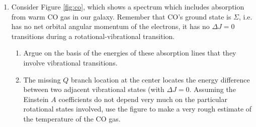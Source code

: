 \documentclass[11pt, preprint]{article}
\begin{document}
\begin{enumerate}
\item Consider Figure \ref{fig:co}, which shows a spectrum which
  includes absorption from warm CO gas in our galaxy.
    Remember that CO's ground state is $\Sigma$, i.e. has no net orbital
    angular momentum of the electrons, it has no $\Delta J = 0$
    transitions during a rotational-vibrational transition.

  \begin{enumerate}
    \item Argue on the basis of the energies of these absorption lines that
      they involve vibrational transitions.
    \item The missing $Q$ branch location at the center locates the
      energy difference between two adjacent vibrational states (with
      $\Delta J = 0$. Assuming the Einstein $A$ coefficients do not
      depend very much on the particular rotational states involved,
      use the figure to make a very rough estimate of the temperature
      of the CO gas. 
  \end{enumerate}


\end{enumerate}
\end{document}
